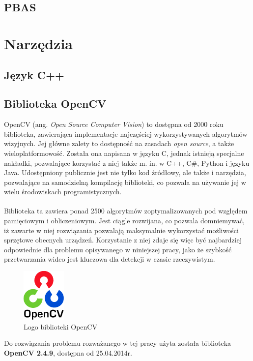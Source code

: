 \subsection{PBAS}
\cite{hofmann2012background}
\section{Narzędzia}
\subsection{Język C++}
\subsection{Biblioteka OpenCV}

OpenCV (ang. \textit{Open Source Computer Vision}) to dostępna od 2000 roku biblioteka, zawierająca implementacje najczęściej wykorzystywanych algorytmów wizyjnych. Jej główne zalety to dostępność na zasadach \textit{open source}, a także wieloplatformowość. Została ona napisana w języku C, jednak istnieją specjalne nakładki, pozwalające korzystać z niej także m. in. w C++, C\#, Python i języku Java. Udostępniony publicznie jest nie tylko kod źródłowy, ale także i narzędzia, pozwalające na samodzielną kompilację biblioteki, co pozwala na używanie jej w wielu środowiskach programistycznych.
\paragraph{}
Biblioteka ta zawiera ponad 2500 algorytmów zoptymalizowanych pod względem pamięciowym i obliczeniowym. Jest ciągle rozwijana, co pozwala domniemywać, iż zawarte w niej rozwiązania pozwalają maksymalnie wykorzystać możliwości sprzętowe obecnych urządzeń. Korzystanie z niej zdaje się więc być najbardziej odpowiednie dla problemu opisywanego w niniejszej pracy, jako że szybkość przetwarzania wideo jest kluczowa dla detekcji w czasie rzeczywistym.
\begin{figure}[!htb]
\centering

\includegraphics[width=82px]{img/ocv_logo}
\caption{Logo biblioteki OpenCV \cite{OpenCVLogo}}
\end{figure}

Do rozwiązania problemu rozważanego w tej pracy użyta została biblioteka \textbf{OpenCV 2.4.9}, dostępna od 25.04.2014r.